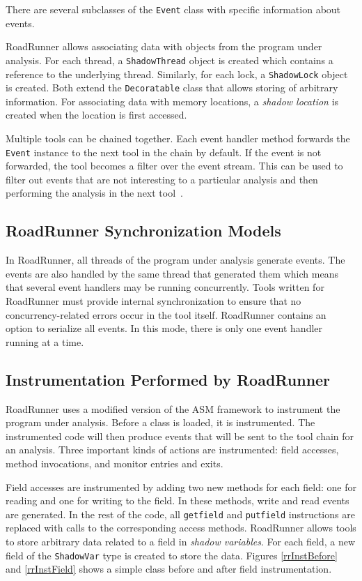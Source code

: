 There are several subclasses of the \texttt{Event} class with specific
information about events.

RoadRunner allows associating data with objects from the program under analysis.
For each thread, a \texttt{ShadowThread} object is created which contains a
reference to the underlying thread. Similarly, for each lock, a
\texttt{ShadowLock} object is created. Both extend the \texttt{Decoratable}
class that allows storing of arbitrary information. For associating data with
memory locations, a \emph{shadow location} is created when the location is first
accessed.

Multiple tools can be chained together. Each event handler method forwards the
\texttt{Event} instance to the next tool in the chain by default. If the event
is not forwarded, the tool becomes a filter over the event stream. This can be
used to filter out events that are not interesting to a particular analysis and
then performing the analysis in the next tool~\cite{RoadRunner}.

\subsection{RoadRunner Synchronization Models}

In RoadRunner, all threads of the program under analysis generate events. The
events are also handled by the same thread that generated them which means that
several event handlers may be running concurrently. Tools written for RoadRunner
must provide internal synchronization to ensure that no concurrency-related
errors occur in the tool itself. RoadRunner contains an option to serialize all
events. In this mode, there is only one event handler running at a time.

\subsection{Instrumentation Performed by RoadRunner}

RoadRunner uses a modified version of the ASM framework to instrument the
program under analysis. Before a class is loaded, it is instrumented. The
instrumented code will then produce events that will be sent to the tool chain
for an analysis. Three important kinds of actions are instrumented: field
accesses, method invocations, and monitor entries and exits.

Field accesses are instrumented by adding two new methods for each field: one
for reading and one for writing to the field. In these methods, write and read
events are generated. In the rest of the code, all \texttt{getfield} and
\texttt{putfield} instructions are replaced with calls to the corresponding
access methods. RoadRunner allows tools to store arbitrary data related to a
field in \emph{shadow variables}. For each field, a new field of the
\texttt{ShadowVar} type is created to store the data. Figures \ref{rrInstBefore}
and \ref{rrInstField} shows a simple class before and after field
instrumentation.


